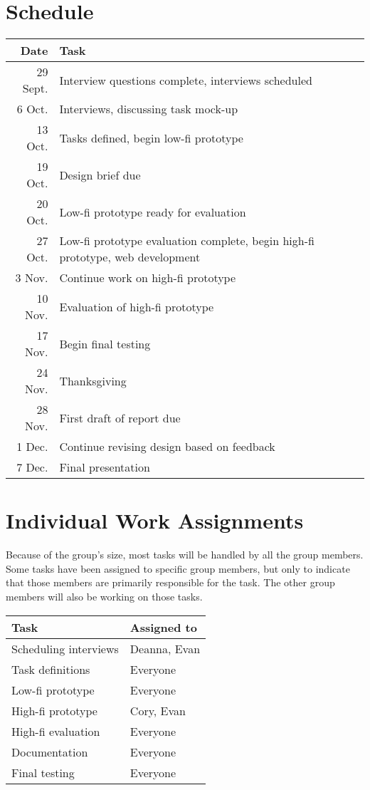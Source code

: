 \documentclass[11pt,letter]{article}
\begin{document}
\section{Schedule}
\begin{tabular}[!h]{rl}
	\textbf{Date} & \textbf{Task} \\
	\hline
	29 Sept. & Interview questions complete, interviews scheduled \\
	 6 Oct.  & Interviews, discussing task mock-up \\
	13 Oct.  & Tasks defined, begin low-fi prototype \\
	19 Oct.  & Design brief due \\
	20 Oct.  & Low-fi prototype ready for evaluation \\
	27 Oct.  & Low-fi prototype evaluation complete, begin high-fi prototype,
	           web development \\
	 3 Nov.  & Continue work on high-fi prototype \\
	10 Nov.  & Evaluation of high-fi prototype \\
	17 Nov.  & Begin final testing \\
	24 Nov.  & Thanksgiving \\
	28 Nov.  & First draft of report due \\
	 1 Dec.  & Continue revising design based on feedback \\
	 7 Dec.  & Final presentation
\end{tabular}

\section{Individual Work Assignments}
Because of the group's size, most tasks will be handled by all the group
members. Some tasks have been assigned to specific group members, but only to
indicate that those members are primarily responsible for the task. The other
group members will also be working on those tasks.

\hfill
\linebreak
\begin{tabular}[!h]{ll}
	\textbf{Task}         & \textbf{Assigned to} \\
	\hline
	Scheduling interviews & Deanna, Evan \\
	Task definitions      & Everyone \\
	Low-fi prototype      & Everyone \\
	High-fi prototype     & Cory, Evan \\
	High-fi evaluation    & Everyone \\
	Documentation         & Everyone \\
	Final testing         & Everyone
\end{tabular}
\end{document}
